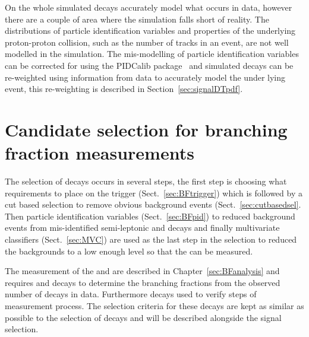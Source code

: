 On the whole simulated decays accurately model what occurs in data, however there are a couple of area where the simulation falls short of reality.
The distributions of particle identification variables and properties of the underlying proton-proton collision, such as the number of tracks in an event, are not well modelled in the simulation. %
The mis-modelling of particle identification variables can be corrected for using the PIDCalib package~\cite{} and simulated decays can be re-weighted using information from data to accurately model the under lying event, this re-weighting is described in Section~\ref{sec:signalDTpdf}. 


\section{Candidate selection for branching fraction measurements}
\label{sec:BFsel}
The selection of \bmumu decays occurs in several steps, the first step is choosing what requirements to place on the trigger (Sect.~\ref{sec:BFtrigger}) which is followed by a cut based selection to remove obvious background events (Sect.~\ref{sec:cutbasedsel}. Then particle identification variables (Sect.~\ref{sec:BFpid}) to reduced background events from mis-identified semi-leptonic and \bhh decays and finally multivariate classifiers (Sect.~\ref{sec:MVC}) are used as the last step in the selection to reduced the backgrounds to a low enough level so that the \bmumu \BFs can be measured.%

The measurement of the \bdmumu and \bsmumu \BFs are described in Chapter~\ref{sec:BFanalysis} and requires \bujpsik and \bhh decays to determine the branching fractions from the observed number of \bmumu decays in data. Furthermore \bsjpsiphi decays used to verify steps of measurement process. The selection criteria for these decays are kept as similar as possible to the selection of \bmumu decays and will be described alongside the signal selection.


